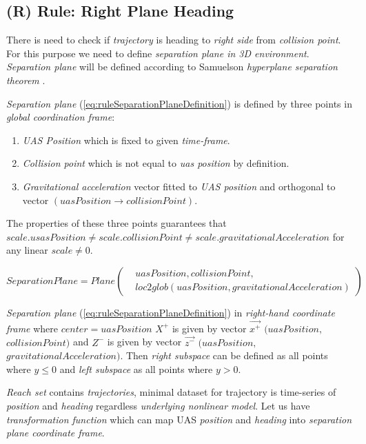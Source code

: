 \subsection{(R) Rule: Right Plane Heading}\label{sec:ruleRightPlaneHeading}
\noindent There is need to check if \emph{trajectory} is heading to \emph{right side} from \emph{collision point}. For this purpose we need to define \emph{separation plane in 3D environment}. \emph{Separation plane} will be defined according to Samuelson \emph{hyperplane separation theorem} \cite{samelson1958partition}.

\emph{Separation plane} (\ref{eq:ruleSeparationPlaneDefinition}) is defined by three points in \emph{global coordination frame}:
\begin{enumerate}
    \item \emph{UAS Position} which is fixed to given \emph{time-frame}.
    \item \emph{Collision point} which is not equal to \emph{uas position} by definition.
    \item \emph{Gravitational acceleration} vector fitted to \emph{UAS position} and orthogonal to vector $(uasPosition\to collisionPoint)$.
\end{enumerate}
The properties of these three points guarantees that 
$scale.usasPosition\neq scale.collisionPoint \neq scale.gravitationalAcceleration$ for any linear $scale\neq0$.

\begin{equation}\label{eq:ruleSeparationPlaneDefinition}
    SeparationPlane=Plane\left(\begin{aligned}&uasPosition,collisionPoint,\\&loc2glob(uasPosition,gravitationalAcceleration)\end{aligned}\right)
\end{equation}

\noindent \emph{Separation plane} (\ref{eq:ruleSeparationPlaneDefinition}) in \emph{right-hand coordinate frame} where $center=uasPosition$ $X^+$ is given by vector $\vec{x^+}$ $(uasPosition,$ $collisionPoint)$  and $Z^-$ is given by vector $\vec{z^-}$  $(uasPosition,$ $gravitationalAcceleration)$. Then \emph{right subspace} can be defined as all points where $y\le0$ and \emph{left subspace} as all points where $y>0$.

\emph{Reach set} contains \emph{trajectories}, minimal dataset for trajectory is time-series of \emph{position} and \emph{heading} regardless \emph{underlying nonlinear model}. Let us have \emph{transformation function} which can map UAS \emph{position} and \emph{heading} into \emph{separation plane coordinate frame}. 


